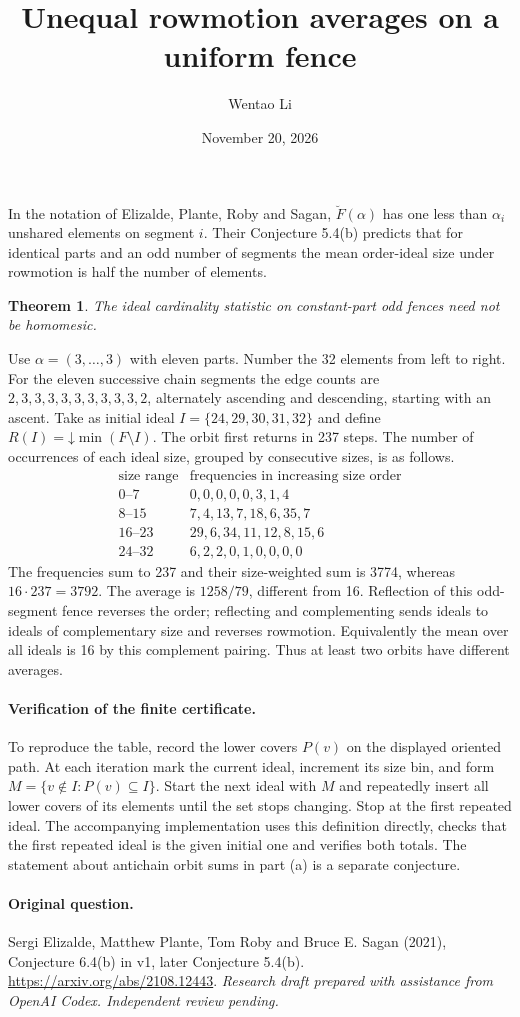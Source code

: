 \documentclass[11pt]{article}
\title{Unequal rowmotion averages on a uniform fence}
\author{Wentao Li}
\date{November 20, 2026}
\newtheorem{theorem}{Theorem}
\begin{document}
\maketitle
In the notation of Elizalde, Plante, Roby and Sagan, $\breve F(\alpha)$ has one less than $\alpha_i$ unshared elements on segment $i$. Their Conjecture 5.4(b) predicts that for identical parts and an odd number of segments the mean order-ideal size under rowmotion is half the number of elements.
\begin{theorem}The ideal cardinality statistic on constant-part odd fences need not be homomesic.\end{theorem}
Use $\alpha=(3,\ldots,3)$ with eleven parts. Number the 32 elements from left to right. For the eleven successive chain segments the edge counts are $2,3,3,3,3,3,3,3,3,3,2$, alternately ascending and descending, starting with an ascent. Take as initial ideal $I=\{24,29,30,31,32\}$ and define $R(I)=\mathord\downarrow\min(F\setminus I)$.
The orbit first returns in 237 steps. The number of occurrences of each ideal size, grouped by consecutive sizes, is as follows.
\[
\begin{array}{c|l}
\text{size range}&\text{frequencies in increasing size order}\\\hline
0\text{--}7&0,0,0,0,0,3,1,4\\
8\text{--}15&7,4,13,7,18,6,35,7\\
16\text{--}23&29,6,34,11,12,8,15,6\\
24\text{--}32&6,2,2,0,1,0,0,0,0
\end{array}
\]
The frequencies sum to 237 and their size-weighted sum is 3774, whereas $16\cdot237=3792$. The average is $1258/79$, different from 16. Reflection of this odd-segment fence reverses the order; reflecting and complementing sends ideals to ideals of complementary size and reverses rowmotion. Equivalently the mean over all ideals is 16 by this complement pairing. Thus at least two orbits have different averages.
\paragraph{Verification of the finite certificate.} To reproduce the table, record the lower covers $P(v)$ on the displayed oriented path. At each iteration mark the current ideal, increment its size bin, and form $M=\{v\notin I:P(v)\subseteq I\}$. Start the next ideal with $M$ and repeatedly insert all lower covers of its elements until the set stops changing. Stop at the first repeated ideal. The accompanying implementation uses this definition directly, checks that the first repeated ideal is the given initial one and verifies both totals. The statement about antichain orbit sums in part (a) is a separate conjecture.

\paragraph{Original question.} Sergi Elizalde, Matthew Plante, Tom Roby and Bruce E. Sagan (2021), Conjecture 6.4(b) in v1, later Conjecture 5.4(b). \url{https://arxiv.org/abs/2108.12443}.
\medskip\noindent\textit{Research draft prepared with assistance from OpenAI Codex. Independent review pending.}
\end{document}
